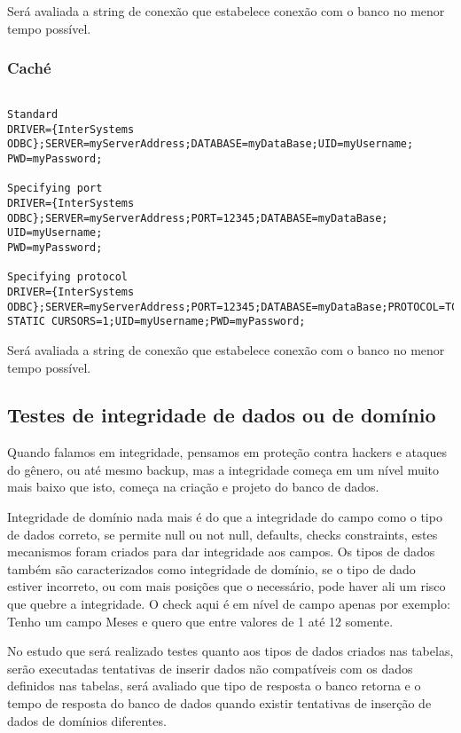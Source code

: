 \normalsize

Será avaliada a string de conexão que estabelece conexão com o banco no menor tempo possível. \cite{orastring}

\subsubsection{Caché}

\scriptsize
\begin{verbatim}

Standard
DRIVER={InterSystems ODBC};SERVER=myServerAddress;DATABASE=myDataBase;UID=myUsername;
PWD=myPassword;

Specifying port
DRIVER={InterSystems ODBC};SERVER=myServerAddress;PORT=12345;DATABASE=myDataBase; UID=myUsername;
PWD=myPassword;
 
Specifying protocol
DRIVER={InterSystems ODBC};SERVER=myServerAddress;PORT=12345;DATABASE=myDataBase;PROTOCOL=TCP;
STATIC CURSORS=1;UID=myUsername;PWD=myPassword;

\end{verbatim}

\normalsize

Será avaliada a string de conexão que estabelece conexão com o banco no menor tempo possível. \cite{cacstring}



\subsection{Testes de integridade de dados ou de domínio}
\label{cha:integridade}


Quando falamos em integridade, pensamos em proteção contra hackers e ataques do gênero, ou até mesmo backup, mas a integridade começa em um nível muito mais baixo que isto, começa na criação e projeto do banco de dados.

Integridade de domínio nada mais é do que a integridade do campo como o tipo de dados correto, se permite null ou not null, defaults, checks constraints, estes mecanismos foram criados para dar integridade aos campos. Os tipos de dados também são caracterizados como integridade de domínio, se o tipo de dado estiver incorreto, ou com mais posições que o necessário, pode haver ali um risco que quebre a integridade. O check aqui é em nível de campo apenas por exemplo: Tenho um campo Meses e quero que entre valores de 1 até 12 somente.

No estudo que será realizado testes quanto aos tipos de dados criados nas tabelas, serão executadas tentativas de inserir dados não compatíveis com os dados definidos nas tabelas, será avaliado que tipo de resposta o banco retorna e o tempo de resposta do banco de dados quando existir tentativas de inserção de dados de domínios diferentes.


